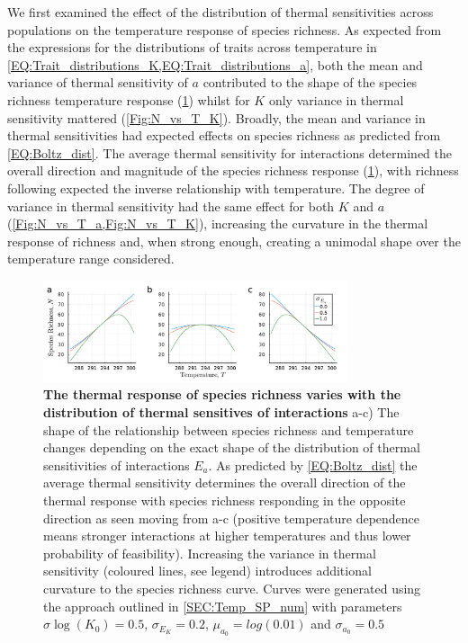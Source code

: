 \documentclass{article}
\begin{document}
We first examined the effect of the distribution of thermal sensitivities across populations on the temperature response of species richness. As expected from the expressions for the distributions of traits across temperature in \cref{EQ:Trait_distributions_K,EQ:Trait_distributions_a}, both the mean and variance of thermal sensitivity of $a$ contributed to the shape of the species richness temperature response (\cref{Fig:N_vs_T_a}) whilst for $K$ only variance in thermal sensitivity mattered (\cref{Fig:N_vs_T_K}). Broadly, the mean and variance in thermal sensitivities had expected effects on species richness as predicted from \cref{EQ:Boltz_dist}. The average thermal sensitivity for interactions determined the overall direction and magnitude of the species richness response (\cref{Fig:N_vs_T_a}), with richness following expected the inverse relationship with temperature. The degree of variance in thermal sensitivity had the same effect for both $K$ and $a$ (\cref{Fig:N_vs_T_a,Fig:N_vs_T_K}), increasing the curvature in the thermal response of richness and, when strong enough, creating a unimodal shape over the temperature range considered.

\begin{figure}
    \centering
    \includegraphics[width=0.8\textwidth]{docs/Figures/Fig_Nsp_Temp_a.pdf}
    \caption{\textbf{The thermal response of species richness  varies with the distribution of thermal sensitives of interactions} a-c) The shape of the relationship between species richness and temperature changes depending on the exact shape of the distribution of thermal sensitivities of interactions $E_a$. As predicted by \cref{EQ:Boltz_dist} the average thermal sensitivity determines the overall direction of the thermal response with species richness responding in the opposite direction as seen moving from a-c (positive temperature dependence means stronger interactions at higher temperatures and thus lower probability of feasibility). Increasing the variance in thermal sensitivity (coloured lines, see legend) introduces additional curvature to the species richness curve. Curves were generated using the approach outlined in \cref{SEC:Temp_SP_num} with parameters $\sigma{\log(K_0)} = 0.5$, $\sigma_{E_K} = 0.2$, $\mu_{a_0} = log(0.01)$ and  $\sigma_{a_0} = 0.5$}
    \label{Fig:N_vs_T_a}
\end{figure}
\end{document}
